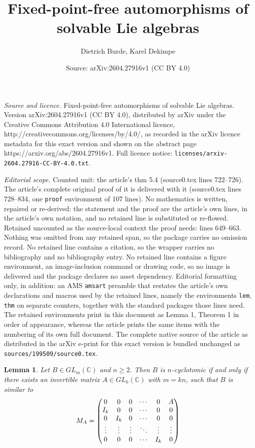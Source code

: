 \documentclass[10pt,a4paper]{amsart}
\title{Fixed-point-free automorphisms of solvable Lie algebras}
\author{Dietrich Burde, Karel Dekimpe}
\date{Source: arXiv:2604.27916v1 (CC BY 4.0)}
\newtheorem{lem}{Lemma}
\newcommand{\C}{\mathbb{C}}
\begin{document}
\maketitle

\noindent\emph{Source and licence.} Fixed-point-free automorphisms of solvable Lie algebras. Version arXiv:2604.27916v1 (CC BY 4.0), distributed by arXiv under the Creative Commons Attribution 4.0 International licence, http://creativecommons.org/licenses/by/4.0/, as recorded in the arXiv licence metadata for this exact version and shown on the abstract page https://arxiv.org/abs/2604.27916v1. Full licence notice: \texttt{licenses/arxiv-2604.27916-CC-BY-4.0.txt}.\par\smallskip

\noindent\textit{Editorial scope.} Counted unit: the article's thm 5.4 (source0.tex lines 722--726). The article's complete original proof of it is delivered with it (source0.tex lines 728--834, one \texttt{proof} environment of 107 lines). No mathematics is written, repaired or re-derived: the statement and the proof are the article's own lines, in the article's own notation, and no retained line is substituted or re-flowed.  Retained uncounted as the source-local context the proof needs: lines 649--663.  Nothing was omitted from any retained span, so the package carries no omission record.  No retained line contains a citation, so the wrapper carries no bibliography and no bibliography entry.  No retained line contains a figure environment, an image-inclusion command or drawing code, so no image is delivered and the package declares no asset dependency.  Editorial formatting only, in addition: an AMS \texttt{amsart} preamble that restates the article's own declarations and macros used by the retained lines, namely the environments \texttt{lem}, \texttt{thm} on separate counters, together with the standard packages those lines need.  The retained environments print in this document as Lemma 1, Theorem 1 in order of appearance, whereas the article prints the same items with the numbering of its own full document.  The complete native source of the article as distributed in the arXiv e-print for this exact version is bundled unchanged as \texttt{sources/199509/source0.tex}.
\begin{lem}\label{5.3}
Let $B\in GL_m(\C)$ and $n\ge 2$. Then $B$ is $n$-cyclotomic if and only if there exists an
invertible matrix $A\in GL_k(\C)$ with $m=kn$, such that $B$ is similar to
\[
M_A=  
\begin{pmatrix}
0 & 0 & 0 & \cdots & 0 & A \cr
I_k & 0 & 0 & \cdots & 0 & 0 \cr
0 & I_k & 0 & \cdots & 0 & 0 \cr
\vdots & \vdots & \vdots & \ddots & \vdots & \vdots \cr
0 & 0 & 0 & \cdots & I_k & 0 
\end{pmatrix}  
\]  
\end{lem}  
\end{document}
